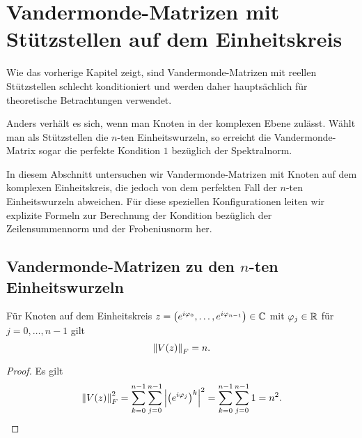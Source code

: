 \chapter{Vandermonde-Matrizen mit Stützstellen auf dem Einheitskreis}

Wie das vorherige Kapitel zeigt, sind Vandermonde-Matrizen mit reellen
Stützstellen schlecht konditioniert und werden daher hauptsächlich für
theoretische Betrachtungen verwendet.

Anders verhält es sich, wenn man Knoten in der komplexen Ebene zulässt.
Wählt man als Stützstellen die $n$-ten Einheitswurzeln, so erreicht die
Vandermonde-Matrix sogar die perfekte Kondition $1$ bezüglich der Spektralnorm.

In diesem Abschnitt untersuchen wir Vandermonde-Matrizen mit Knoten auf dem
komplexen Einheitskreis, die jedoch von dem perfekten Fall der $n$-ten
Einheitswurzeln abweichen.
Für diese speziellen Konfigurationen leiten wir explizite Formeln zur
Berechnung der Kondition bezüglich der Zeilensummennorm und der Frobeniusnorm
her.

\section{Vandermonde-Matrizen zu den \boldmath $n$-ten Einheitswurzeln}

\begin{lemma}
    \label{lemma:frobenius_norm_vandermonde_unit_circle}
    Für Knoten auf dem Einheitskreis
    $z = \left(e^{i \varphi_0}, \dots, e^{i \varphi_{n-1}} \right) \in \mathbb{C}$
    mit $\varphi_j \in \mathbb{R}$ für $j = 0, \dots, n-1$ gilt
    \begin{equation}
        \left\lVert V \! \left( z \right) \right\rVert_F = n.
    \end{equation}
\end{lemma}
\begin{proof}
    Es gilt
    \[
        \left\lVert V \! \left( z \right) \right\rVert_F^2
        = \sum_{k=0}^{n-1} \sum_{j=0}^{n-1} \left\lvert  \left(e^{i \varphi_j}\right)^k  \right\rvert^2
        = \sum_{k=0}^{n-1} \sum_{j=0}^{n-1} 1
        = n^2.
    \]
\end{proof}


